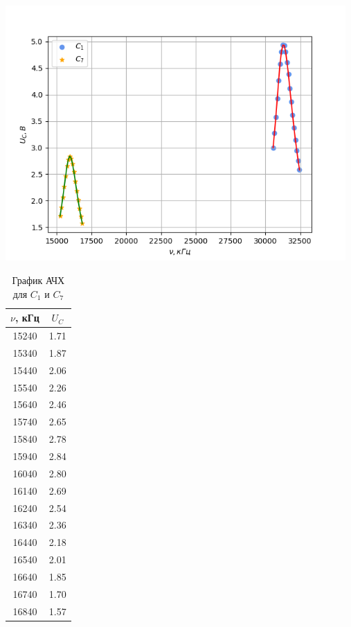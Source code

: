 \begin{table}[h!]
\begin{minipage}{0.7\textwidth}
        \includegraphics[width=13cm]{./images/plot1.png}
        \caption*{График АЧХ для $C_1$ и $C_7$}
    \end{minipage}
    \begin{minipage}{0.3\linewidth}
        \begin{tabular}{|c|c|}
            \hline
            $\nu$, кГц  & $U_C$\\\hline
            15240 & 1.71 \\\hline
            15340 & 1.87 \\\hline
            15440 & 2.06 \\\hline
            15540 & 2.26 \\\hline
            15640 & 2.46 \\\hline
            15740 & 2.65 \\\hline
            15840 & 2.78 \\\hline
            15940 & 2.84 \\\hline
            16040 & 2.80 \\\hline
            16140 & 2.69 \\\hline
            16240 & 2.54 \\\hline
            16340 & 2.36 \\\hline
            16440 & 2.18 \\\hline
            16540 & 2.01 \\\hline
            16640 & 1.85 \\\hline
            16740 & 1.70 \\\hline
            16840 & 1.57 \\\hline
        \end{tabular}

\end{minipage}
\end{table}
